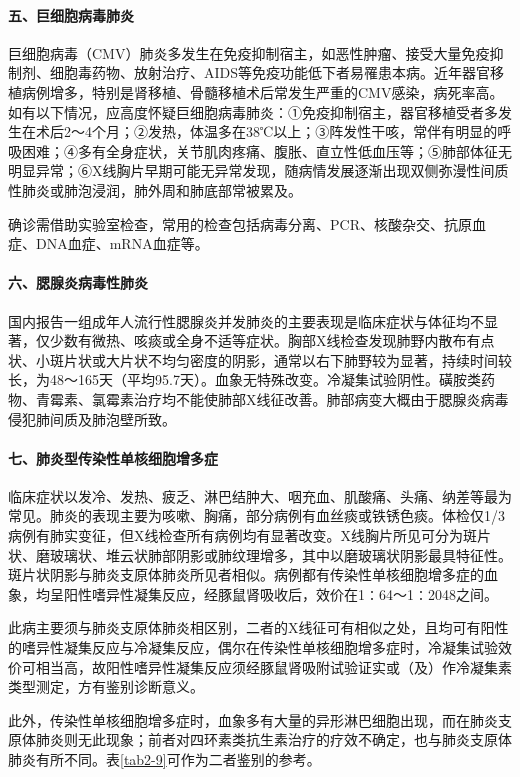 \paragraph{五、巨细胞病毒肺炎}

巨细胞病毒（CMV）肺炎多发生在免疫抑制宿主，如恶性肿瘤、接受大量免疫抑制剂、细胞毒药物、放射治疗、AIDS等免疫功能低下者易罹患本病。近年器官移植病例增多，特别是肾移植、骨髓移植术后常发生严重的CMV感染，病死率高。如有以下情况，应高度怀疑巨细胞病毒肺炎：①免疫抑制宿主，器官移植受者多发生在术后2～4个月；②发热，体温多在38℃以上；③阵发性干咳，常伴有明显的呼吸困难；④多有全身症状，关节肌肉疼痛、腹胀、直立性低血压等；⑤肺部体征无明显异常；⑥X线胸片早期可能无异常发现，随病情发展逐渐出现双侧弥漫性间质性肺炎或肺泡浸润，肺外周和肺底部常被累及。

确诊需借助实验室检查，常用的检查包括病毒分离、PCR、核酸杂交、抗原血症、DNA血症、mRNA血症等。

\paragraph{六、腮腺炎病毒性肺炎}

国内报告一组成年人流行性腮腺炎并发肺炎的主要表现是临床症状与体征均不显著，仅少数有微热、咳痰或全身不适等症状。胸部X线检查发现肺野内散布有点状、小斑片状或大片状不均匀密度的阴影，通常以右下肺野较为显著，持续时间较长，为48～165天（平均95.7天）。血象无特殊改变。冷凝集试验阴性。磺胺类药物、青霉素、氯霉素治疗均不能使肺部X线征改善。肺部病变大概由于腮腺炎病毒侵犯肺间质及肺泡壁所致。

\paragraph{七、肺炎型传染性单核细胞增多症}

临床症状以发冷、发热、疲乏、淋巴结肿大、咽充血、肌酸痛、头痛、纳差等最为常见。肺炎的表现主要为咳嗽、胸痛，部分病例有血丝痰或铁锈色痰。体检仅1/3病例有肺实变征，但X线检查所有病例均有显著改变。X线胸片所见可分为斑片状、磨玻璃状、堆云状肺部阴影或肺纹理增多，其中以磨玻璃状阴影最具特征性。斑片状阴影与肺炎支原体肺炎所见者相似。病例都有传染性单核细胞增多症的血象，均呈阳性嗜异性凝集反应，经豚鼠肾吸收后，效价在1∶64～1∶2048之间。

此病主要须与肺炎支原体肺炎相区别，二者的X线征可有相似之处，且均可有阳性的嗜异性凝集反应与冷凝集反应，偶尔在传染性单核细胞增多症时，冷凝集试验效价可相当高，故阳性嗜异性凝集反应须经豚鼠肾吸附试验证实或（及）作冷凝集素类型测定，方有鉴别诊断意义。

此外，传染性单核细胞增多症时，血象多有大量的异形淋巴细胞出现，而在肺炎支原体肺炎则无此现象；前者对四环素类抗生素治疗的疗效不确定，也与肺炎支原体肺炎有所不同。表\ref{tab2-9}可作为二者鉴别的参考。

